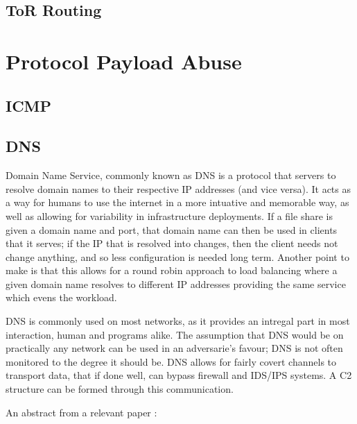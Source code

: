 \subsection{ToR Routing}


\section{Protocol Payload Abuse}
\subsection{ICMP}
\subsection{DNS}
Domain Name Service, commonly known as DNS is a protocol that servers to resolve domain names to their respective IP addresses (and vice versa). It acts as a way for humans to use the internet in a more intuative and
memorable way, as well as allowing for variability in infrastructure deployments. If a file share is given a domain name and port, that domain name can then be used in clients that it serves; if the IP that is resolved into changes,
then the client needs not change anything, and so less configuration is needed long term. Another point to make is that this allows for a round robin approach to load balancing where a given domain name resolves to different IP addresses providing the
same service which evens the workload. 

DNS is commonly used on most networks, as it provides an intregal part in most interaction, human and programs alike. The assumption that DNS would be on practically any network can be used in an adversarie's favour; DNS is not often monitored to the degree it should be.
DNS allows for fairly covert channels to transport data, that if done well, can bypass firewall and IDS/IPS systems. A C2 structure can be formed through this communication.

An abstract from a relevant paper \citep{DNSExfiltration}: 

